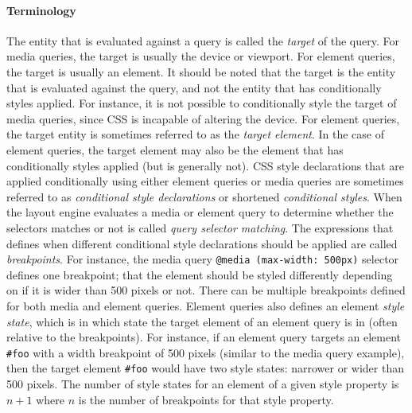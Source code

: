 \documentclass[a4paper,11pt]{kth-mag}
\newcommand{\code}[1]{\texttt{#1}}
\begin{document}
      \paragraph{Terminology}
      The entity that is evaluated against a query is called the \emph{target} of the query.
      For media queries, the target is usually the device or viewport.
      For element queries, the target is usually an element.
      It should be noted that the target is the entity that is evaluated against the query, and not the entity that has conditionally styles applied.
      For instance, it is not possible to conditionally style the target of media queries, since \gls{CSS} is incapable of altering the device.
      For element queries, the target entity is sometimes referred to as the \emph{target element}.
      In the case of element queries, the target element may also be the element that has conditionally styles applied (but is generally not).
      \gls{CSS} style declarations that are applied conditionally using either element queries or media queries are sometimes referred to as \emph{conditional style declarations} or shortened \emph{conditional styles}.
      When the layout engine evaluates a media or element query to determine whether the selectors matches or not is called \emph{query selector matching}.
      The expressions that defines when different conditional style declarations should be applied are called \emph{breakpoints}.
      For instance, the media query \code{@media (max-width: 500px)} selector defines one breakpoint; that the element should be styled differently depending on if it is wider than 500 pixels or not.
      There can be multiple breakpoints defined for both media and element queries.
      Element queries also defines an element \emph{style state}, which is in which state the target element of an element query is in (often relative to the breakpoints).
      For instance, if an element query targets an element \code{\#foo} with a width breakpoint of 500 pixels (similar to the media query example), then the target element \code{\#foo} would have two style states: narrower or wider than 500 pixels.
      The number of style states for an element of a given style property is $n + 1$ where $n$ is the number of breakpoints for that style property.
\end{document}
